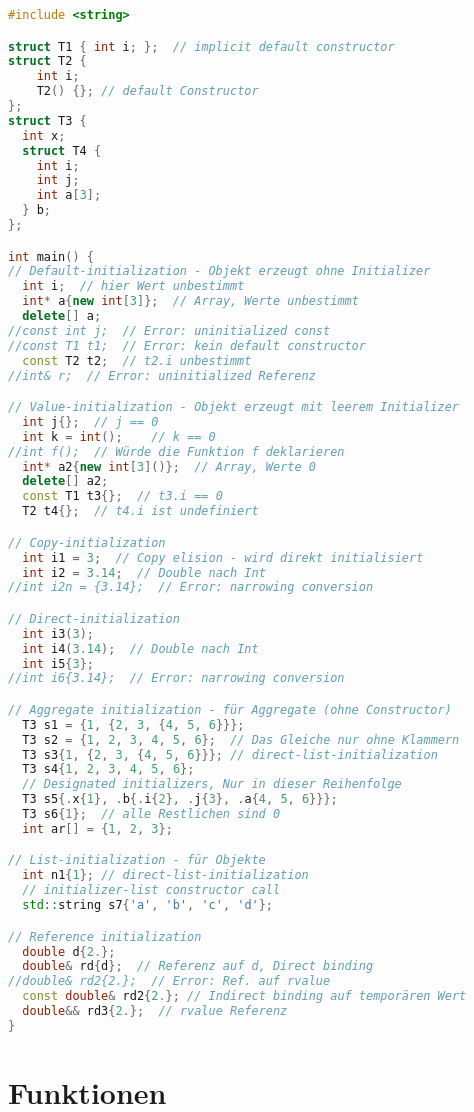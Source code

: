 \documentclass[10pt,twocolumn]{scrartcl}
\begin{document}
\begin{lstlisting}[language=C++]
#include <string>

struct T1 { int i; };  // implicit default constructor
struct T2 {
    int i;
    T2() {}; // default Constructor
};
struct T3 {
  int x;
  struct T4 {
    int i;
    int j;
    int a[3];
  } b;
};

int main() {
// Default-initialization - Objekt erzeugt ohne Initializer
  int i;  // hier Wert unbestimmt
  int* a{new int[3]};  // Array, Werte unbestimmt
  delete[] a;
//const int j;  // Error: uninitialized const
//const T1 t1;  // Error: kein default constructor
  const T2 t2;  // t2.i unbestimmt
//int& r;  // Error: uninitialized Referenz

// Value-initialization - Objekt erzeugt mit leerem Initializer
  int j{};  // j == 0
  int k = int();    // k == 0
//int f();  // Würde die Funktion f deklarieren
  int* a2{new int[3]()};  // Array, Werte 0
  delete[] a2;
  const T1 t3{};  // t3.i == 0
  T2 t4{};  // t4.i ist undefiniert

// Copy-initialization
  int i1 = 3;  // Copy elision - wird direkt initialisiert
  int i2 = 3.14;  // Double nach Int
//int i2n = {3.14};  // Error: narrowing conversion

// Direct-initialization
  int i3(3);
  int i4(3.14);  // Double nach Int
  int i5{3};
//int i6{3.14};  // Error: narrowing conversion

// Aggregate initialization - für Aggregate (ohne Constructor)
  T3 s1 = {1, {2, 3, {4, 5, 6}}};
  T3 s2 = {1, 2, 3, 4, 5, 6};  // Das Gleiche nur ohne Klammern
  T3 s3{1, {2, 3, {4, 5, 6}}}; // direct-list-initialization
  T3 s4{1, 2, 3, 4, 5, 6};
  // Designated initializers, Nur in dieser Reihenfolge
  T3 s5{.x{1}, .b{.i{2}, .j{3}, .a{4, 5, 6}}};
  T3 s6{1};  // alle Restlichen sind 0
  int ar[] = {1, 2, 3};

// List-initialization - für Objekte
  int n1{1}; // direct-list-initialization
  // initializer-list constructor call
  std::string s7{'a', 'b', 'c', 'd'};

// Reference initialization
  double d{2.};
  double& rd{d};  // Referenz auf d, Direct binding
//double& rd2{2.};  // Error: Ref. auf rvalue
  const double& rd2{2.}; // Indirect binding auf temporären Wert
  double&& rd3{2.};  // rvalue Referenz
}
\end{lstlisting}

\section{Funktionen}
\end{document}
